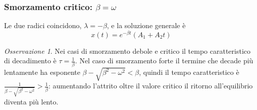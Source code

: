 \documentclass[11pt, a4paper, openright]{book}
\theoremstyle{plain}
\theoremstyle{definition}
\theoremstyle{remark}
\newtheorem{osservazione}[teorema]{Osservazione}
\begin{document}
\subsubsection{Smorzamento critico: $\beta = \omega$}
Le due radici coincidono, $\lambda = -\beta$, e la soluzione generale è
\begin{equation}
    x(t) = e^{-\beta t}\left(A_1 + A_2 t\right)
\end{equation}

\begin{osservazione}
    Nei casi di smorzamento debole e critico il tempo caratteristico di decadimento è $\tau = \frac{1}{\beta}$. Nel caso di smorzamento forte il termine che decade più lentamente ha esponente $\beta - \sqrt{\beta^2 - \omega^2} < \beta$, quindi il tempo caratteristico è $\frac{1}{\beta - \sqrt{\beta^2 - \omega^2}} > \frac{1}{\beta}$: aumentando l'attrito oltre il valore critico il ritorno all'equilibrio diventa più lento.
\end{osservazione}
\end{document}
